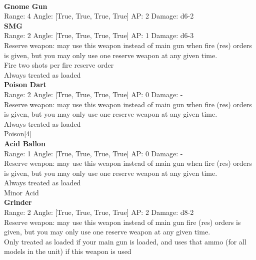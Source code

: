 \ \\
{\bf Gnome Gun } \\



Range: 4  Angle: [True, True, True, True] AP: 2 Damage: d6-2 \\




{\bf SMG } \\



Range: 2  Angle: [True, True, True, True] AP: 1 Damage: d6-3 \\
Reserve weapon: may use this weapon instead of main gun when fire (res) orders is given, but you may only use one reserve weapon at any given time.\\ 
Fire two shots per fire reserve order\\ 
Always treated as loaded\\ 




{\bf Poison Dart } \\



Range: 2  Angle: [True, True, True, True] AP: 0 Damage: - \\
Reserve weapon: may use this weapon instead of main gun when fire (res) orders is given, but you may only use one reserve weapon at any given time.\\ 
Always treated as loaded\\ 
Poison[4]\\ 




{\bf Acid Ballon } \\



Range: 1  Angle: [True, True, True, True] AP: 0 Damage: - \\
Reserve weapon: may use this weapon instead of main gun when fire (res) orders is given, but you may only use one reserve weapon at any given time.\\ 
Always treated as loaded\\ 
Minor Acid\\ 




{\bf Grinder } \\



Range: 2  Angle: [True, True, True, True] AP: 2 Damage: d8-2 \\
Reserve weapon: may use this weapon instead of main gun fire (res) orders is given, but you may only use one reserve weapon at any given time.\\ 
Only treated as loaded if your main gun is loaded, and uses that ammo (for all models in the unit) if this weapon is used\\ 




